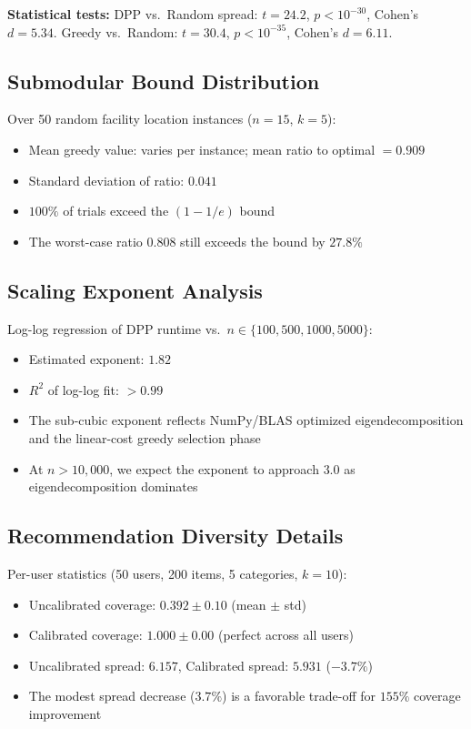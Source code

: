 \documentclass[11pt]{article}
\begin{document}
\textbf{Statistical tests:} DPP vs.\ Random spread: $t = 24.2$, $p < 10^{-30}$, Cohen's $d = 5.34$.
Greedy vs.\ Random: $t = 30.4$, $p < 10^{-35}$, Cohen's $d = 6.11$.

\subsection{Submodular Bound Distribution}

Over 50 random facility location instances ($n{=}15$, $k{=}5$):

\begin{itemize}[leftmargin=*]
\item Mean greedy value: varies per instance; mean ratio to optimal $= 0.909$
\item Standard deviation of ratio: $0.041$
\item $100\%$ of trials exceed the $(1{-}1/e)$ bound
\item The worst-case ratio $0.808$ still exceeds the bound by $27.8\%$
\end{itemize}

\subsection{Scaling Exponent Analysis}

Log-log regression of DPP runtime vs.\ $n \in \{100, 500, 1000, 5000\}$:
\begin{itemize}[leftmargin=*]
\item Estimated exponent: $1.82$
\item $R^2$ of log-log fit: $>0.99$
\item The sub-cubic exponent reflects NumPy/BLAS optimized eigendecomposition
  and the linear-cost greedy selection phase
\item At $n > 10{,}000$, we expect the exponent to approach $3.0$ as
  eigendecomposition dominates
\end{itemize}

\subsection{Recommendation Diversity Details}

Per-user statistics (50 users, 200 items, 5 categories, $k{=}10$):
\begin{itemize}[leftmargin=*]
\item Uncalibrated coverage: $0.392 \pm 0.10$ (mean $\pm$ std)
\item Calibrated coverage: $1.000 \pm 0.00$ (perfect across all users)
\item Uncalibrated spread: $6.157$, Calibrated spread: $5.931$ ($-3.7\%$)
\item The modest spread decrease ($3.7\%$) is a favorable trade-off for
  $155\%$ coverage improvement
\end{itemize}
\end{document}
